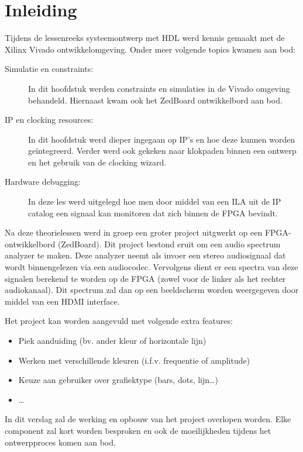 \chapter{Inleiding}

\par Tijdens de lessenreeks systeemontwerp met HDL werd kennis gemaakt met de Xilinx Vivado ontwikkelomgeving. Onder meer volgende topics kwamen aan bod:
	
		\begin{description}
			\item[Simulatie en constraints:] In dit hoofdstuk werden constraints en simulaties in de Vivado omgeving behandeld. Hiernaast kwam ook het ZedBoard ontwikkelbord aan bod.
			\item[IP en clocking resources:] In dit hoofdstuk werd dieper ingegaan op IP's en hoe deze kunnen worden ge\"integreerd. Verder werd ook gekeken naar klokpaden binnen een ontwerp en het gebruik van de clocking wizard.
			\item[Hardware debugging:] In deze les werd uitgelegd hoe men door middel van een ILA uit de IP catalog een signaal kan monitoren dat zich binnen de FPGA bevindt. 
		\end{description}

\par Na deze theorielessen werd in groep een groter project uitgwerkt op een FPGA-ontwikkelbord (ZedBoard). Dit project bestond eruit om een audio spectrum analyzer te maken. Deze analyzer neemt als invoer een stereo audiosignaal dat wordt binnengelezen via een audiocodec. Vervolgens dient er een spectra van deze signalen berekend te worden op de FPGA (zowel voor de linker als het rechter audiokanaal). Dit spectrum zal dan op een beeldscherm worden weergegeven door middel van een HDMI interface. 

\par Het project kan worden aangevuld met volgende extra features:

		\begin{itemize}
			\item Piek aanduiding (bv. ander kleur of horizontale lijn)
			\item Werken met verschillende kleuren (i.f.v. frequentie of amplitude)
			\item Keuze aan gebruiker over grafiektype (bars, dots, lijn\ldots)
			\item \ldots
		\end{itemize}

\par In dit verslag zal de werking en opbouw van het project overlopen worden. Elke component zal kort worden besproken en ook de moeilijkheden tijdens het ontwerpproces komen aan bod.